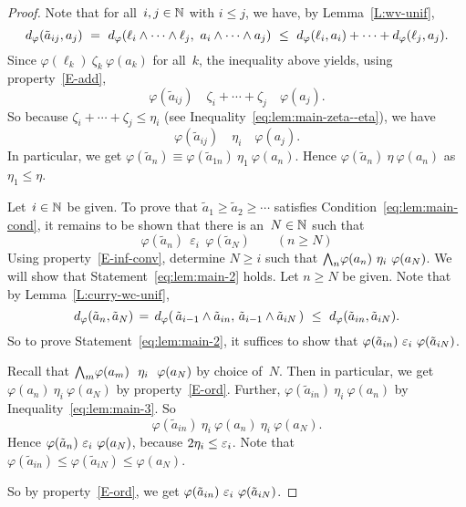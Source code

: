 \documentclass[main.tex]{subfiles}
\begin{document}
\begin{proof}
Note that for all~$i,j\in\mathbb{N}$ with $i\leq j$, we have,
by Lemma~\ref{L:wv-unif},
\begin{equation*}
\ld\varphi(\tilde a_{ij},a_j)\ =\ 
\ld\varphi(\ell_i \wedge\dotsb\wedge \ell_j,\  a_i \wedge \dotsb \wedge a_j)
\ \leq\ \ld\varphi(\ell_i,a_i)+\dotsb+\ld\varphi(\ell_j,a_j)\text{.}
\end{equation*}
Since $\varphi(\ell_k)\ \zeta_k\ \varphi(a_k)$
for all~$k$, 
the inequality above 
yields,
using property~\ref{E-add},
\begin{equation*}
\varphi(\tilde a_{ij}) \quad \zeta_i + \dotsb + \zeta_j\quad \varphi(a_j).
\end{equation*}
So because
$\zeta_i+\dotsb+\zeta_j \leq \eta_i$ 
(see Inequality~\eqref{eq:lem:main-zeta--eta}),
we have
\begin{equation}
\label{eq:lem:main-3}
\varphi(\tilde a_{ij} )\quad\eta_i\quad\varphi (a_j).
\end{equation}
In particular,
we get $\varphi (\tilde a_n)\equiv \varphi(\tilde a_{1n}) \ \eta_1 \ \varphi (a_n)$.
Hence $\varphi(\tilde a_n) \ \eta\ \varphi(a_n)$
as $\eta_1 \leq \eta$.

Let~$i\in \mathbb{N}$ be given.
To prove that $\tilde a_1 \geq \tilde a_2 \geq \dotsb$
satisfies Condition~\eqref{eq:lem:main-cond},
it remains to be shown that 
there is an~$N\in\mathbb{N}$ such that
\begin{equation}
\label{eq:lem:main-2}
\varphi(\tilde a_n)\ \ \varepsilon_i \ \ \varphi(\tilde a_N)
\qquad (n \geq N)
\end{equation}
Using property~\ref{E-inf-conv},
determine $N\geq i$ such that $\bw_n \varphi (a_n) \ \eta_i\ \varphi(a_N)$.
We will show that Statement~\eqref{eq:lem:main-2} holds.
Let $n\geq N$ be given.
Note that 
 by Lemma~\ref{L:curry-wc-unif},
\begin{equation*}
d_{\smash{\varphi}} (\tilde a_n, \tilde a_N)
\,=\,d_{\smash{\varphi}}(\,\tilde a_{i-1} \wedge \tilde a_{in},\,
\tilde a_{i-1} \wedge \tilde a_{iN}\,)
\ \leq\ d_{\smash{\varphi}}(\tilde a_{in},\tilde a_{iN}).
\end{equation*}
So to prove Statement~\eqref{eq:lem:main-2},
it suffices to show 
that $\varphi(\tilde a_{in} ) \ \ve_i\ \varphi(\tilde a_{iN})$.

Recall that $\bw_m\varphi(a_m)\ \ \eta_i\ \ \varphi(a_N)$
by choice of~$N$. Then in particular,
we get
$\varphi(a_n) \ \eta_i\ \varphi(a_N)$
by property~\ref{E-ord}.
Further, $\varphi(\tilde a_{in}) \ \eta_i\ \varphi(a_n)$
by Inequality~\eqref{eq:lem:main-3}. So
\begin{equation*}
\varphi (\tilde a_{in})\ \eta_i\ 
\varphi (a_{n})\ \eta_i\ \varphi (a_N).
\end{equation*}
Hence $\varphi (\tilde a_n) \ \varepsilon_i\ \varphi (a_N)$,
because $2\eta_i \leq \varepsilon_i$.
Note that $\varphi(\tilde a_{in}) \leq 
\varphi(\tilde a_{iN}) \leq \varphi(a_N)$.

So by property~\ref{E-ord},
we get
$\varphi(\tilde a_{in}) \ \ve_i\  \varphi(\tilde a_{iN})$.
\end{proof}
\end{document}
